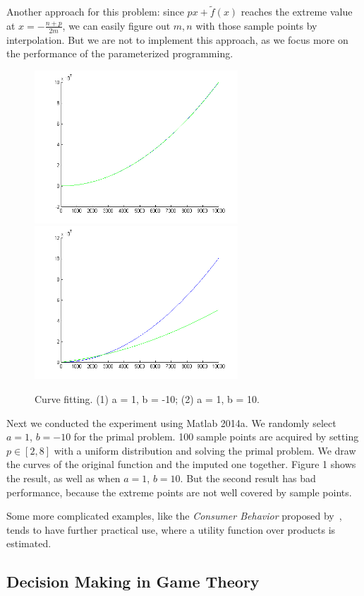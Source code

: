 Another approach for this problem: since $px+\tilde{f}(x)$ reaches the extreme value at $x=-\frac{n+p}{2m}$, we can easily figure out $m,n$ with those sample points by interpolation. But we are not to implement this approach, as we focus more on the performance of the parameterized programming.

\begin{figure}\label{fig:case1}
\centering
\includegraphics[width=3in]{plots/p1.png}
\includegraphics[width=3in]{plots/p2.png}
\caption{Curve fitting. (1) a = 1, b = -10; (2) a = 1, b = 10.}
\end{figure}

Next we conducted the experiment using Matlab 2014a. We randomly select $a=1$, $b=-10$ for the primal problem. 100 sample points are acquired by setting $p\in[2,8]$ with a uniform distribution and solving the primal problem. We draw the curves of the original function and the imputed one together. Figure 1 shows the result, as well as when $a=1$, $b=10$. But the second result has bad performance, because the extreme points are not well covered by sample points.

Some more complicated examples, like the \textit{Consumer Behavior} proposed by~\cite{keshavarz2011}, tends to have further practical use, where a utility function over products is estimated.

\subsection{Decision Making in Game Theory}

